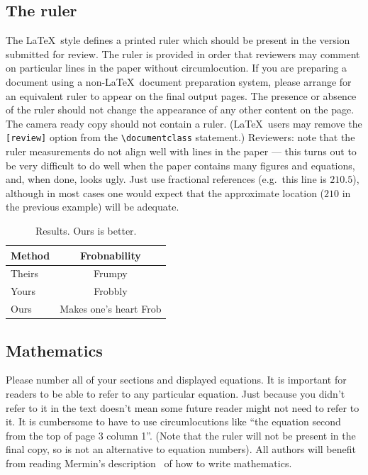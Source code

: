 \documentclass[extendedabs]{recpad2k}
\begin{document}
\subsection{The ruler}
The \LaTeX\ style defines a printed ruler which should be present in the
version submitted for review.  The ruler is provided in order that
reviewers may comment on particular lines in the paper without
circumlocution.  If you are preparing a document using a non-\LaTeX\
document preparation system, please arrange for an equivalent ruler to
appear on the final output pages.  The presence or absence of the ruler
should not change the appearance of any other content on the page.  The
camera ready copy should not contain a ruler. (\LaTeX\ users may remove
the \verb'[review]' option from the \verb'\documentclass' statement.)
Reviewers: note that the ruler measurements do not align well with lines
in the paper --- this turns out to be very difficult to do well when the
paper contains many figures and equations, and, when done, looks ugly.
Just use fractional references (e.g.\ this line is $210.5$), although in
most cases one would expect that the approximate location ($210$ in the
previous example) will be adequate.


\begin{table}
\begin{center}
\begin{tabular}{|l|c|}
\hline
Method & Frobnability \\
\hline\hline
Theirs & Frumpy \\
Yours & Frobbly \\
Ours & Makes one's heart Frob\\
\hline
\end{tabular}
\end{center}
\caption{Results.   Ours is better.}
\end{table}

\subsection{Mathematics}

Please number all of your sections and displayed equations.  It is
important for readers to be able to refer to any particular equation.  Just
because you didn't refer to it in the text doesn't mean some future reader
might not need to refer to it.  It is cumbersome to have to use
circumlocutions like ``the equation second from the top of page 3 column
1''.  (Note that the ruler will not be present in the final copy, so is not
an alternative to equation numbers).  All authors will benefit from reading
Mermin's description~\cite{Mermin89} of how to write mathematics.
\end{document}
